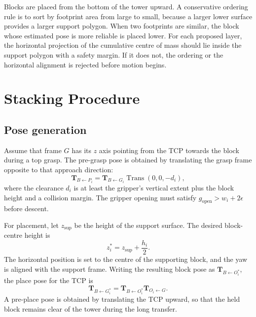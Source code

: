 \documentclass{article}
\begin{document}
Blocks are placed from the bottom of the tower upward. A conservative ordering
rule is to sort by footprint area from large to small, because a larger lower
surface provides a larger support polygon. When two footprints are similar, the
block whose estimated pose is more reliable is placed lower. For each proposed
layer, the horizontal projection of the cumulative centre of mass should lie
inside the support polygon with a safety margin. If it does not, the ordering or
the horizontal alignment is rejected before motion begins.

\section{Stacking Procedure}\label{sec:procedure}

\subsection{Pose generation}

Assume that frame $G$ has its $z$ axis pointing from the TCP towards the block
during a top grasp. The pre-grasp pose is obtained by translating the grasp
frame opposite to that approach direction:
\begin{equation}\label{eq:pregrasp}
  \mathbf{T}_{B\leftarrow P_i}
  =
  \mathbf{T}_{B\leftarrow G_i}
  \operatorname{Trans}(0,0,-d_i),
\end{equation}
where the clearance $d_i$ is at least the gripper's vertical extent plus the
block height and a collision margin. The gripper opening must satisfy
$g_{\mathrm{open}}>w_i+2\epsilon$ before descent.

For placement, let $z_{\mathrm{sup}}$ be the height of the support surface. The
desired block-centre height is
\begin{equation}\label{eq:placeheight}
  z_i^{*}=z_{\mathrm{sup}}+\frac{h_i}{2}.
\end{equation}
The horizontal position is set to the centre of the supporting block, and the
yaw is aligned with the support frame. Writing the resulting block pose as
$\mathbf{T}_{B\leftarrow O_i^{*}}$, the place pose for the TCP is
\begin{equation}\label{eq:placepose}
  \mathbf{T}_{B\leftarrow G_i^{*}}
  =
  \mathbf{T}_{B\leftarrow O_i^{*}}
  \mathbf{T}_{O_i\leftarrow G}.
\end{equation}
A pre-place pose is obtained by translating the TCP upward, so that the held
block remains clear of the tower during the long transfer.
\end{document}
